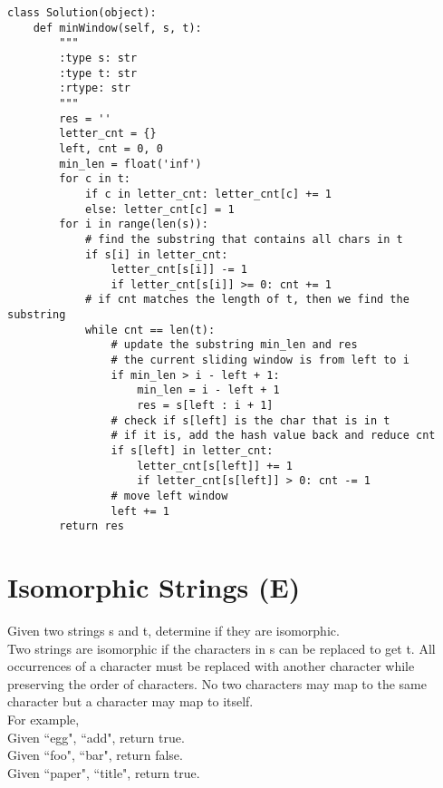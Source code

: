 \begin{lstlisting}
class Solution(object):
    def minWindow(self, s, t):
        """
        :type s: str
        :type t: str
        :rtype: str
        """
        res = ''
        letter_cnt = {}
        left, cnt = 0, 0
        min_len = float('inf')
        for c in t:
            if c in letter_cnt: letter_cnt[c] += 1
            else: letter_cnt[c] = 1
        for i in range(len(s)):
            # find the substring that contains all chars in t
            if s[i] in letter_cnt:
                letter_cnt[s[i]] -= 1
                if letter_cnt[s[i]] >= 0: cnt += 1
            # if cnt matches the length of t, then we find the substring
            while cnt == len(t):
                # update the substring min_len and res
                # the current sliding window is from left to i
                if min_len > i - left + 1:
                    min_len = i - left + 1
                    res = s[left : i + 1]
                # check if s[left] is the char that is in t
                # if it is, add the hash value back and reduce cnt
                if s[left] in letter_cnt:
                    letter_cnt[s[left]] += 1
                    if letter_cnt[s[left]] > 0: cnt -= 1
                # move left window
                left += 1
        return res
\end{lstlisting}

\section{Isomorphic Strings (E)}
Given two strings s and t, determine if they are isomorphic. \\

Two strings are isomorphic if the characters in s can be replaced to get t. All occurrences of a character must be replaced with another character while preserving the order of characters. No two characters may map to the same character but a character may map to itself.\\

For example,\\
Given ``egg", ``add", return true.\\
Given ``foo", ``bar", return false.\\
Given ``paper", ``title", return true.\\

